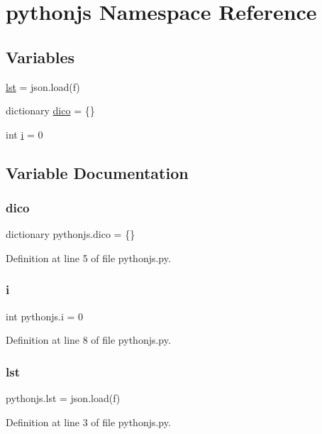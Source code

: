 \hypertarget{namespacepythonjs}{}\section{pythonjs Namespace Reference}
\label{namespacepythonjs}
\subsection*{Variables}
\begin{DoxyCompactItemize}
\item 
\mbox{\hyperlink{namespacepythonjs_afc4d2f7c6eb063214760bf7aa2ed6fac}{lst}} = json.\+load(f)
\item 
dictionary \mbox{\hyperlink{namespacepythonjs_a345e2965c312b00edf196a53b0be4859}{dico}} = \{\}
\item 
int \mbox{\hyperlink{namespacepythonjs_acce6fb66f7f72e1af73263515399d802}{i}} = 0
\end{DoxyCompactItemize}


\subsection{Variable Documentation}
\mbox{\label{namespacepythonjs_a345e2965c312b00edf196a53b0be4859}} 
\subsubsection{\texorpdfstring{dico}{dico}}
{\footnotesize\ttfamily dictionary pythonjs.\+dico = \{\}}



Definition at line 5 of file pythonjs.\+py.

\mbox{\label{namespacepythonjs_acce6fb66f7f72e1af73263515399d802}} 
\subsubsection{\texorpdfstring{i}{i}}
{\footnotesize\ttfamily int pythonjs.\+i = 0}



Definition at line 8 of file pythonjs.\+py.

\mbox{\label{namespacepythonjs_afc4d2f7c6eb063214760bf7aa2ed6fac}} 
\subsubsection{\texorpdfstring{lst}{lst}}
{\footnotesize\ttfamily pythonjs.\+lst = json.\+load(f)}



Definition at line 3 of file pythonjs.\+py.

